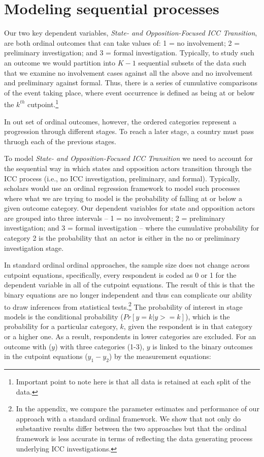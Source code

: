 
\section*{Modeling sequential processes}

Our two key dependent variables, \emph{State- and Opposition-Focused ICC Transition}, are both ordinal outcomes that can take values of: 1 = no involvement; 2 = preliminary investigation; and 3 = formal investigation. Typically, to study such an outcome we would partition into $K-1$ sequential subsets of the data such that we examine no involvement cases against all the above and no involvement and preliminary against formal. Thus, there is a series of cumulative comparisons of the event taking place, where event occurrence is defined as being at or below the $k^{th}$ cutpoint.\footnote{Important point to note here is that all data is retained at each split of the data.}

In out set of ordinal outcomes, however, the ordered categories represent a progression through different stages. To reach a later stage, a country must pass thruogh each of the previous stages. 

To model \emph{State- and Opposition-Focused ICC Transition} we need to account for the sequential way in which states and opposition actors transition through the ICC process (i.e., no ICC investigation, preliminary, and formal). Typically, scholars would use an ordinal regression framework to model such processes where what we are trying to model is the probability of falling at or below a given outcome category. Our dependent variables for state and opposition actors are grouped into three intervals -- 1 = no involvement; 2 = preliminary investigation; and 3 = formal investigation -- where the cumulative probability for category 2 is the probability that an actor is either in the no or preliminary investigation stage.

In standard ordinal ordinal approaches, the sample size does not change across cutpoint equations, specifically, every respondent is coded as 0 or 1 for the dependent variable in all of the cutpoint equations. The result of this is that the binary equations are no longer independent and thus can complicate our ability to draw inferences from statistical tests.\footnote{In the appendix, we compare the parameter estimates and performance of our approach with a standard ordinal framework. We show that not only do substantive results differ between the two approaches but that the ordinal framework is less accurate in terms of reflecting the data generating process underlying ICC investigations.} The probability of interest in stage models is the conditional probability ($Pr[ y = k | y >= k]$), which is the probability for a particular category, $k$, given the respondent is in that category or a higher one. As a result, respondents in lower categories are excluded. For an outcome with ($y$) with three categories (1-3), $y$ is linked to the binary outcomes in the cutpoint equations ($y_{1} - y_{2}$) by the measurement equations:

